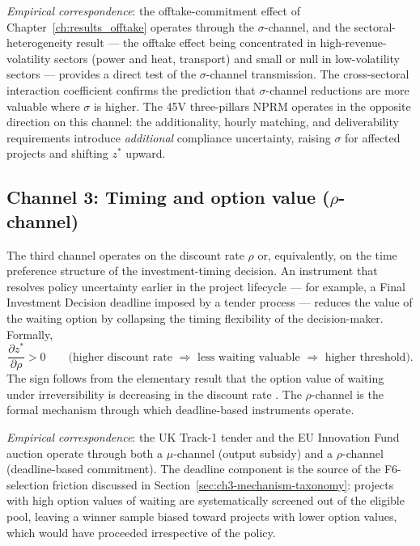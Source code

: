 \emph{Empirical correspondence}: the offtake-commitment effect of Chapter~\ref{ch:results_offtake} operates through the $\sigma$-channel, and the sectoral-heterogeneity result --- the offtake effect being concentrated in high-revenue-volatility sectors (power and heat, transport) and small or null in low-volatility sectors --- provides a direct test of the $\sigma$-channel transmission. The cross-sectoral interaction coefficient confirms the prediction that $\sigma$-channel reductions are more valuable where $\sigma$ is higher. The 45V three-pillars NPRM operates in the opposite direction on this channel: the additionality, hourly matching, and deliverability requirements introduce \emph{additional} compliance uncertainty, raising $\sigma$ for affected projects and shifting $z^*$ upward.

\subsection{Channel 3: Timing and option value ($\rho$-channel)}
\label{sec:ch3-channel-rho}

The third channel operates on the discount rate $\rho$ or, equivalently, on the time preference structure of the investment-timing decision. An instrument that resolves policy uncertainty earlier in the project lifecycle --- for example, a Final Investment Decision deadline imposed by a tender process --- reduces the value of the waiting option by collapsing the timing flexibility of the decision-maker. Formally,
\[
\frac{\partial z^*}{\partial \rho} > 0 \qquad \text{(higher discount rate $\Rightarrow$ less waiting valuable $\Rightarrow$ higher threshold)}.
\]
The sign follows from the elementary result that the option value of waiting under irreversibility is decreasing in the discount rate \cite{bertola1994irreversibility, abel1996options}. The $\rho$-channel is the formal mechanism through which deadline-based instruments operate.

\emph{Empirical correspondence}: the UK Track-1 tender and the EU Innovation Fund auction operate through both a $\mu$-channel (output subsidy) and a $\rho$-channel (deadline-based commitment). The deadline component is the source of the F6-selection friction discussed in Section~\ref{sec:ch3-mechanism-taxonomy}: projects with high option values of waiting are systematically screened out of the eligible pool, leaving a winner sample biased toward projects with lower option values, which would have proceeded irrespective of the policy.

